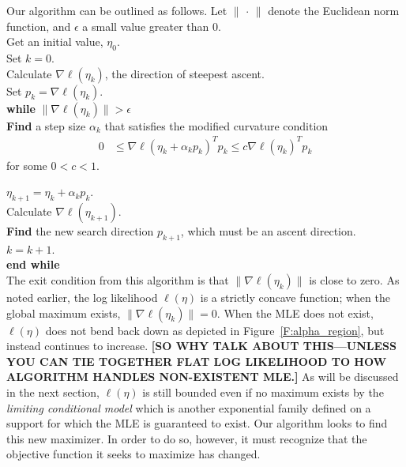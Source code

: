 
Our algorithm can be outlined as follows.  Let $\lVert \, \cdot \, \rVert$ denote the 
Euclidean norm function, and $\epsilon$ 
a small value greater than 0.  \\

\noindent Get an initial value, $\eta_0$.\\ 
Set $k=0$. \\
Calculate $\nabla \ell( \eta_k)$, the direction of steepest ascent. \\
Set $p_k = \nabla \ell( \eta_k)$. \\
\textbf{while}  $\lVert \nabla \ell( \eta_k) \rVert > \epsilon$ \\ 
\hspace{4mm} \indent	 \textbf{Find} a step size $\alpha_k$ that satisfies the modified 
curvature condition
\begin{align*}
	 0 & \leq \nabla \ell( \eta_k + \alpha_k p_k)^T p_k \leq c \nabla \ell(\eta_k)^T 
p_k
\end{align*}
\indent for some $0 < c < 1$.  


$\eta_{k+1} = \eta_k + \alpha_k p_k$.\\
\indent Calculate $\nabla \ell( \eta_{k+1})$.\\
\indent \textbf{Find} the new search direction $p_{k+1}$, which must be an ascent 
direction. \\
\indent $k = k + 1$.  \\
\textbf{end while}\\

The exit condition from this algorithm is that $\lVert \nabla \ell( \eta_k) \rVert$
is close to zero.  As noted earlier, the log likelihood $\ell(\eta)$ is a strictly
concave function; when the global maximum exists, $\lVert \nabla \ell( \eta_k) \rVert = 0$.  When the MLE does not exist, $\ell(\eta)$ does not bend back down
as depicted in Figure~\ref{F:alpha_region}, but instead continues to increase.
\textbf{[SO WHY TALK ABOUT THIS---UNLESS YOU CAN TIE TOGETHER FLAT LOG LIKELIHOOD
TO HOW ALGORITHM HANDLES NON-EXISTENT MLE.]} 
As will be discussed in the next section, $\ell(\eta)$ is still bounded even if
no maximum exists by the \emph{limiting conditional model} which is another
exponential family defined on a support for which the MLE is
guaranteed to exist.
Our algorithm looks to find this new maximizer.  In order to do so, however, it must 
recognize that the objective function it seeks to maximize has changed.

